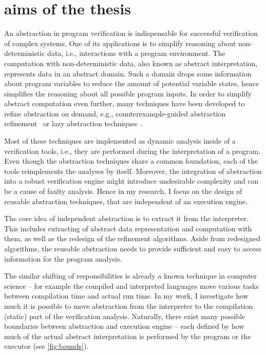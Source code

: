 \chapter{aims of the thesis}
\label{ch:aim}


An abstraction in program verification is indispensable for successful
verification of complex systems. One of its applications is to simplify
reasoning about non-deterministic data, i.e., interactions with a program
environment. The computation with non-de\-ter\-mi\-nistic data, also known as
abstract interpretation, represents data in an abstract domain. Such a domain
drops some information about program variables to reduce the amount of
potential variable states, hence simplifies the reasoning about all possible
program inputs. In order to simplify abstract computation even further, many
techniques have been developed to refine abstraction on demand, e.g.,
counterexample-guided abstraction refinement~\cite{Clarke2000} or lazy abstraction
techniques~\cite{Henzinger2002}.

Most of these techniques are implemented as dynamic analysis inside of a
verification tools, i.e., they are performed during the interpretation of a
program. Even though the abstraction techniques share a common foundation, each
of the tools reimplements the analyses by itself. Moreover, the integration of
abstraction into a robust verification engine might introduce undesirable
complexity and can be a cause of faulty analysis. Hence in my research, I focus
on the design of reusable abstraction techniques, that are independent of an
execution engine.

The core idea of independent abstraction is to extract it from the interpreter.
This includes extracting of abstract data representation and computation with
them, as well as the redesign of the refinement algorithms. Aside from
redesigned algorithms, the reusable abstraction needs to provide sufficient and
easy to access information for the program analysis.

The similar shifting of responsibilities is already a known technique in
computer science -- for example the compiled and interpreted languages move
various tasks between compilation time and actual run time. In my work, I
investigate how much it is possible to move abstraction from the interpreter to
the compilation (static) part of the verification analysis. Naturally, there
exist many possible boundaries between abstraction and execution engine -- each
defined by how much of the actual abstract interpretation is performed by the
program or the executor (see \autoref{fig:bounds}).


